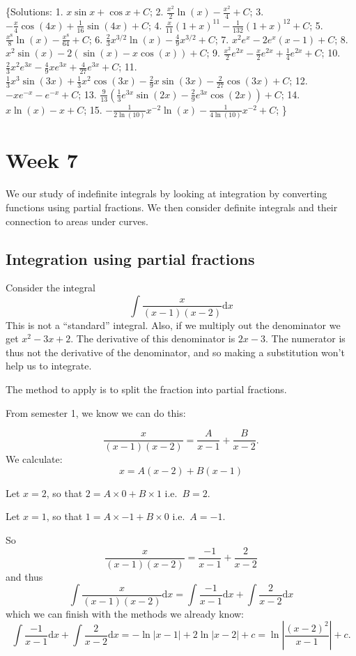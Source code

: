 \documentclass[
  english,
  11pt,
  oneside]{book}
\newcommand{\slide}{}
\theoremstyle{definition}
\theoremstyle{definition}
\theoremstyle{definition}
\theoremstyle{definition}
\theoremstyle{remark}
\begin{document}
\{Solutions:
1. \(x\sin x+\cos x + C\);
2. \(\frac{x^2}{2}\ln(x) - \frac{x^2}{4}+C\);
3. \(-\frac{x}{4}\cos(4x)+\frac{1}{16}\sin(4x)+C\);
4. \(\frac{x}{11}(1+x)^{11} - \frac{1}{132}(1+x)^{12}+C\);
5. \(\frac{x^8}{8}\ln(x) - \frac{x^8}{64}+C\);
6. \(\frac{2}{3}x^{3/2}\ln(x) - \frac{4}{9}x^{3/2}+C\);
7. \(x^2e^x - 2e^x(x-1)+C\);
8. \(x^2\sin(x) - 2(\sin(x)-x\cos(x))+C\);
9. \(\frac{x^2}{2}e^{2x}-\frac{x}{2}e^{2x}+\frac{1}{4}e^{2x}+C\);
10. \(\frac{2}{3}x^2e^{3x}-\frac{4}{9}xe^{3x}+\frac{4}{27}e^{3x}+C\);
11. \(\frac{1}{3}x^3\sin(3x)+\frac{1}{3}x^2\cos(3x)-\frac{2}{9}x\sin(3x)-\frac{2}{27}\cos(3x)+C\);
12. \(-xe^{-x}-e^{-x}+C\);
13. \(\frac{9}{13}\left( \frac{1}{3}e^{3x}\sin(2x)-\frac{2}{9}e^{3x}\cos(2x) \right)+C\);
14. \(x\ln(x) - x +C\);
15. \(-\frac{1}{2\ln(10)}x^{-2}\ln(x) - \frac{1}{4\ln(10)}x^{-2} + C\);
\}

\chapter{Week 7}\label{week-seven}

We our study of indefinite integrals by looking at integration by converting functions using partial fractions. We then consider definite integrals and their connection to areas under curves.
\slide

\section{Integration using partial fractions}\label{integration-using-partial-fractions}

Consider the integral
\[
\int\frac{x}{(x-1)(x-2)}\mathrm{d}x
\]
This is not a ``standard'' integral. Also, if we multiply out the denominator we get \(x^2 - 3x + 2\). The derivative of this denominator is \(2x - 3\). The numerator is thus not the derivative of the denominator, and so making a substitution won't help us to integrate.

The method to apply is to split the fraction into partial fractions.

From semester 1, we know we can do this:

\begin{notslides}

\[
\frac{x}{(x-1)(x-2)} = \frac A{x-1}+\frac B{x-2}.
\]
We calculate:
\[
x = A(x-2)+B(x-1)
\]

Let \(x=2\), so that \(2=A\times0+B\times1\) i.e.~\(B=2\).

Let \(x=1\), so that \(1=A\times-1+B\times0\) i.e.~\(A=-1\).

So
\[
\frac{x}{(x-1)(x-2)} = \frac {-1}{x-1}+\frac 2{x-2}
\]
and thus
\[
\int\frac{x}{(x-1)(x-2)}\mathrm{d}x = \int\frac {-1}{x-1}\mathrm{d}x+\int\frac 2{x-2}\mathrm{d}x
\]
which we can finish with the methods we already know:
\[
\int\frac {-1}{x-1}\mathrm{d}x+\int\frac 2{x-2}\mathrm{d}x = -\ln|x-1|+2\ln|x-2|+c = \ln\left|\frac{(x-2)^2}{x-1}\right|+c.
\]

\end{notslides}
\end{document}
